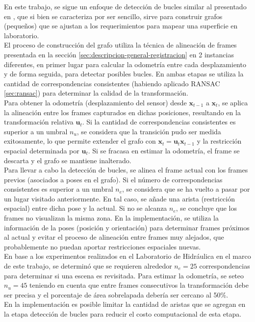 En este trabajo, se sigue un enfoque de detección de bucles similar al presentado en \cite{henry2010rgb}, que si bien se caracteriza por ser sencillo, sirve para construir grafos (pequeños) que se ajustan a los requerimientos para mapear una superficie en laboratorio. \\
El proceso de construcción del grafo utiliza la técnica de alineación de frames presentada en la sección \ref{sec:descripcion-general-registracion} en 2 instancias diferentes, en primer lugar para calcular la odometría entre cada desplazamiento y de forma seguida, para detectar posibles bucles. En ambas etapas se utiliza la cantidad de correspondencias consistentes (habiendo aplicado RANSAC \ref{sec:ransac}) para determinar la calidad de la transformación. \\
Para obtener la odometría (desplazamiento del sensor) desde $\textbf{x}_{t-1}$ a $\textbf{x}_{t}$, se aplica la alineación entre los frames capturados en dichas posiciones, resultando en la transformación relativa $\textbf{u}_{t}$. Si la cantidad de correspondencias consistentes es superior a un umbral $n_{u}$, se considera que la transición pudo ser medida exitosamente, lo que permite extender el grafo con $\textbf{x}_{t} = \textbf{u}_{t} \textbf{x}_{t-1}$ y la restricción espacial determinada por $\textbf{u}_{t}$. Si se fracasa en estimar la odometría, el frame se descarta y el grafo se mantiene inalterado. \\
Para llevar a cabo la detección de bucles, se alinea el frame actual con los frames previos (asociados a poses en el grafo). Si el número de correspondencias consistentes es superior a un umbral $n_{e}$, se considera que se ha vuelto a pasar por un lugar visitado anteriormente. En tal caso, se añade una arista (restricción espacial) entre dicha pose y la actual. Si no se alcanza $n_{e}$, se concluye que los frames no visualizan la misma zona. En la implementación, se utiliza la información de la poses (posición y orientación) para determinar frames próximos al actual y evitar el proceso de alineación entre frames muy alejados, que probablemente no puedan aportar restricciones espaciales nuevas. \\
En base a los experimentos realizados en el Laboratorio de Hidráulica en el marco de este trabajo, se determinó que se requieren alrededor $n_{e} = 25$ correspondencias para determinar si una escena es revisitada. Para estimar la odometría, se seteo $n_{u} = 45$ teniendo en cuenta que entre frames consecutivos la transformación debe ser precisa y el porcentaje de área sobrelapada debería ser cercano al 50\%. \\
En la implementación es posible limitar la cantidad de aristas que se agregan en la etapa detección de bucles para reducir el costo computacional de esta etapa.

